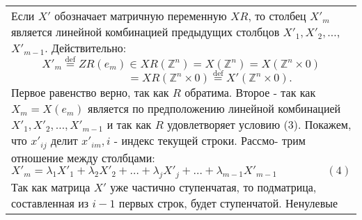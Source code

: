 \documentclass{mai_book}
\begin{document}
\begin{tabular}{|p{12.5cm}}
	Если $X'$ обозначает матричную переменную $XR$, то столбец $X'_m$\linebreak
	является линейной комбинацией предыдущих столбцов $X'_1, X'_2, \ldots$,\linebreak
	$X'_{m - 1}$. Действительно:
	$$X'_m \stackrel{\text{def}}{=} ZR(e_m)\in XR({\mathbb Z}^n) = X({\mathbb Z}^n) = X({\mathbb Z}^n \times 0)$$
	$${\ \ \ \ \ \ \ \ \ \ \ \ \ \ \ \ \ \ \ \ \ \ \ }= XR({\mathbb Z}^n \times 0) \stackrel{\text{def}}{=} X'({\mathbb Z}^n \times 0).$$
	Первое равенство верно, так как $R$ обратима. Второе - так как\linebreak
	$X_m = X(e_m)$ является по предположению линейной комбинацией\linebreak
	$X'_1, X'_2, \ldots, X'_{m - 1}$ и так как $R$ удовлетворяет условию (3).\linebreak
	Покажем, что $x'_{ij}$ делит $x'_{im}, i$ - индекс текущей строки. Рассмо-\linebreak
	трим отношение между столбцами:
	$$X'_m = \lambda_1 X'_1 + \lambda_2 X'_2 + \ldots + \lambda_j X'_j + \ldots + \lambda_{m - 1} X'_{m - 1} {\ \ \ \ \ \ \ \ \ \ \ \ \ \ \ \ \ \ \ \ (4)}$$
	Так как матрица $X'$ уже частично ступенчатая, то подматрица,\linebreak
	составленная из $i - 1$ первых строк, будет ступенчатой. Ненулевые\linebreak
	\end{tabular}
	
	\pagebreak
	
	
\end{document}
